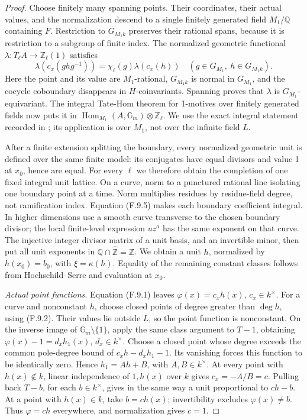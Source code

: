 \documentclass[11pt]{article}
\begin{document}
\begin{proof}
Choose finitely many spanning points. Their coordinates, their
actual values, and the normalization descend to a single
finitely generated field \(M_1/\mathbb Q\) containing \(F\).
Restriction to \(G_{M_1k}\) preserves their rational spans,
because it is restriction to a subgroup of finite index.
The normalized geometric functional
\(\lambda:T_\ell A\to\mathbb Z_\ell(1)\) satisfies
\[
 \lambda(c_x(ghg^{-1}))
       =\chi_\ell(g)\lambda(c_x(h))
 \quad(g\in G_{M_1},\ h\in G_{M_1k}).
\]
Here the point and its value are \(M_1\)-rational,
\(G_{M_1k}\) is normal in \(G_{M_1}\), and the cocycle
coboundary disappears in \(H\)-coinvariants. Spanning proves
that \(\lambda\) is \(G_{M_1}\)-equivariant.
The integral Tate-Hom theorem for 1-motives over finitely generated
fields now puts it in
\(\operatorname{Hom}_{M_1}(A,\mathbb G_m)\otimes\mathbb Z_\ell\).
We use the exact integral statement recorded in
\citet[Section~1.4]{FF_Jossen2014}; its application is over
\(M_1\), not over the infinite field \(L\).

After a finite extension splitting the boundary, every normalized
geometric unit is defined over the same finite model: its conjugates
have equal divisors and value 1 at \(x_0\), hence are equal.
For every \(\ell\) we therefore obtain the completion of one
fixed integral unit lattice. On a curve, norm to a punctured
rational line isolating one boundary point at a time. Norm
multiplies residues by residue-field degree, not ramification
index. Equation (F.9.5) makes each boundary coefficient integral.
In higher dimensions use a smooth curve transverse to the chosen
boundary divisor; the local finite-level expression \(uz^a\)
has the same exponent on that curve. The injective integer divisor
matrix of a unit basis, and an invertible minor, then put all unit
exponents in \(\mathbb Q\cap\widehat{\mathbb Z}=\mathbb Z\).
We obtain a unit \(h\), normalized by \(h(x_0)=b_0\), with
\(\xi=\kappa(h)\). Equality of the remaining constant classes
follows from Hochschild--Serre and evaluation at \(x_0\).

\emph{Actual point functions.}
Equation (F.9.1) leaves \(\varphi(x)=c_xh(x)\), \(c_x\in k^\times\).
For a curve and nonconstant \(h\), choose closed points of
degree greater than \(\deg h\), using (F.9.2). Their values
lie outside \(L\), so the point function is nonconstant.
On the inverse image of \(\mathbb G_m\setminus\{1\}\), apply
the same class argument to \(T-1\), obtaining
\(\varphi(x)-1=d_xh_1(x)\), \(d_x\in k^\times\).
Choose a closed point whose degree exceeds the common pole-degree
bound of \(c_xh-d_xh_1-1\). Its vanishing forces this function
to be identically zero. Hence \(h_1=Ah+B\), with
\(A,B\in k^\times\). At every point with \(h(x)\notin k\),
linear independence of \(1,h(x)\) over \(k\) gives
\(c_x=-A/B=c\). Pulling back \(T-b\), for each
\(b\in k^\times\), gives in the same way a unit proportional
to \(ch-b\). At a point with \(h(x)\in k\), take
\(b=ch(x)\); invertibility excludes \(\varphi(x)\ne b\).
Thus \(\varphi=ch\) everywhere, and normalization gives \(c=1\).


\end{proof}
\end{document}
